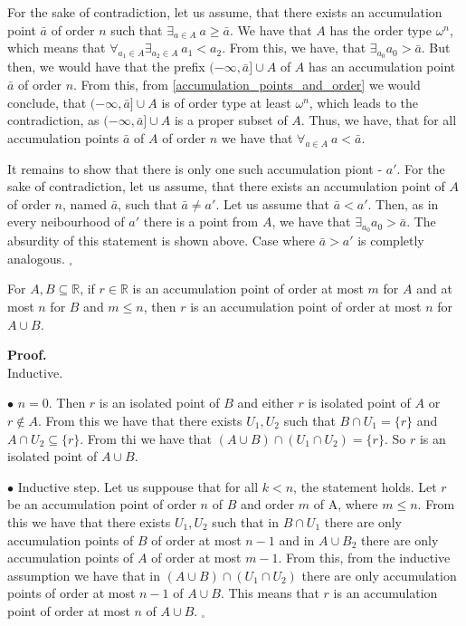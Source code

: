 For the sake of contradiction, let us assume, that there exists an accumulation 
point $\bar{a}$ of order $n$ such that $\exists_{a\in A}\ a\geq \bar{a}$. We have that $A$ has 
the order type $\omega^n$, which means that $\forall_{a_1\in A}\exists_{a_2 \in A}\ a_1 < a_2$. 
From this, we have, that $\exists_{a_0} a_0 > \bar{a}$. But then, we would have that the prefix 
$(-\infty, \bar{a}] \cup A$ of $A$ has an accumulation point $\bar{a}$ of order $n$. 
From this, from \ref{accumulation_points_and_order} we would conclude, 
that $(-\infty, \bar{a}] \cup A$ is of 
order type at least $\omega^n$, which leads to the contradiction, as $(-\infty, \bar{a}] \cup A$ 
is a proper subset of $A$. Thus, we have, that for all accumulation points $\bar{a}$ of $A$ of 
order $n$ we have that $\forall_{a\in A}\ a<\bar{a}$. 

It remains to show that there is only one 
such accumulation piont - $a'$. For the sake of contradiction, let us assume, that 
there exists an accumulation point of $A$ of order $n$, named $\bar{a}$, such that 
$\bar{a} \neq a'$. Let us assume that $\bar{a} < a'$. Then, as in every neibourhood 
of $a'$ there is a point from $A$, we have 
that $\exists_{a_0} a_0 > \bar{a}$. The absurdity of this statement is shown above. 
Case where $\bar{a} > a'$ is completly analogous. $_\square$


\begin{lemma}\label{The order does not grow lemma}
For $A, B \subseteq \mathbb{R}$, if $r \in \mathbb{R}$ is an accumulation point 
of order at most $m$ for $A$ and at most $n$ for $B$ and $m \leq n$, then $r$ 
is an accumulation point of order at most $n$ for $A \cup B$.  
\end{lemma}%
\textbf{Proof.}\\
Inductive. 

$\bullet$ $n = 0$. Then $r$ is an isolated point of $B$ and either $r$ is isolated point of $A$ 
or $r \not\in A$. From this we have that there exists $U_1, U_2$ such that $B \cap U_1 = \{r\}$ and 
$A \cap U_2 \subseteq \{r\}$. From thi we have that $(A\cup B) \cap (U_1\cap U_2) = \{r\}$. 
So $r$ is an isolated point of $A \cup B$.

$\bullet$ Inductive step. Let us suppouse that for all $k < n$, the statement holds. Let $r$ 
be an accumulation point of order $n$ of $B$ and order $m$ of A, where $m \leq n$. From this 
we have that there exists $U_1, U_2$ such that in $B\cap U_1$ there are only accumulation points 
of $B$ of order at most $n-1$ and in $A \cup B_2$ there are only accumulation points of $A$ 
of order at most $m-1$. From this, from the inductive assumption we have that in 
$(A \cup B) \cap (U_1 \cap U_2)$ there are only accumulation points of order at most $n-1$ of 
$A \cup B$. This means that $r$ is an accumulation point of order at most $n$ of $A\cup B$. 
$_\square$   


